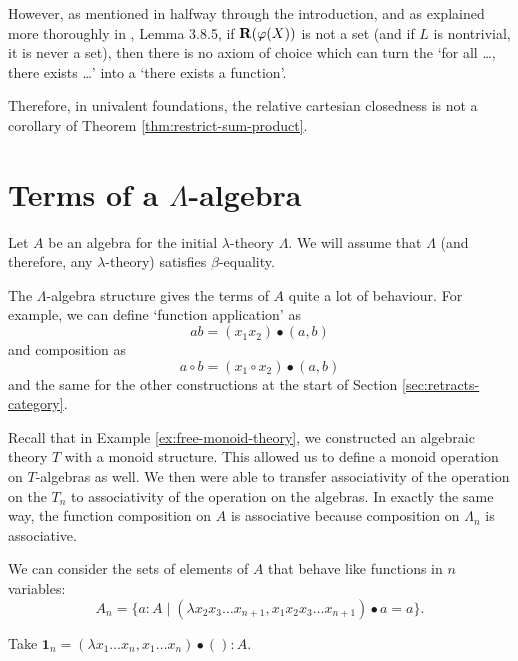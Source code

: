 \begin{remark}
  However, as mentioned in \cite{univalent-categories} halfway through the introduction, and as explained more thoroughly in \cite{hottbook}, Lemma 3.8.5, if $ \mathbf{R}(\varphi(X)) $ is not a set (and if $ L $ is nontrivial, it is never a set), then there is no axiom of choice which can turn the `for all \dots, there exists \dots' into a `there exists a function'.

  Therefore, in univalent foundations, the relative cartesian closedness is not a corollary of Theorem \ref{thm:restrict-sum-product}.
\end{remark}

\section{Terms of a \texorpdfstring{$ \Lambda $}{Lambda}-algebra}
Let $ A $ be an algebra for the initial $ \lambda $-theory $ \Lambda $. We will assume that $ \Lambda $ (and therefore, any $ \lambda $-theory) satisfies $ \beta $-equality.

The $ \Lambda $-algebra structure gives the terms of $ A $ quite a lot of behaviour. For example, we can define `function application' as
\[ a b = (x_1 x_2) \bullet (a, b) \]
and composition as
\[ a \circ b = (x_1 \circ x_2) \bullet (a, b) \]
and the same for the other constructions at the start of Section \ref{sec:retracts-category}.

\begin{remark}
  Recall that in Example \ref{ex:free-monoid-theory}, we constructed an algebraic theory $ T $ with a monoid structure. This allowed us to define a monoid operation on $ T $-algebras as well. We then were able to transfer associativity of the operation on the $ T_n $ to associativity of the operation on the algebras. In exactly the same way, the function composition on $ A $ is associative because composition on $ \Lambda_n $ is associative.
\end{remark}

\begin{definition}
  We can consider the sets of elements of $ A $ that behave like functions in $ n $ variables:
  \[ A_n = \{ a : A \mid (\lambda x_2 x_3 \dots x_{n + 1}, x_1 x_2 x_3 \dots x_{n + 1}) \bullet a = a \}. \]
\end{definition}

\begin{definition}
  Take $ \mathbf 1_n = (\lambda x_1 \dots x_n, x_1 \dots x_n) \bullet () : A $.
\end{definition}

